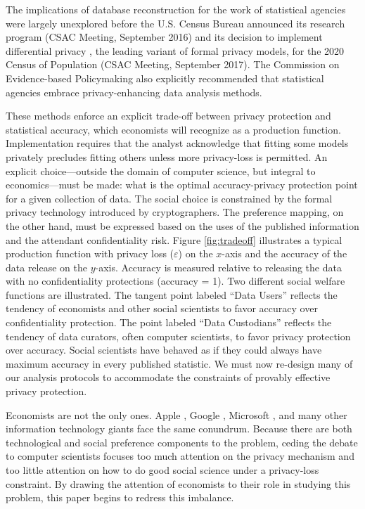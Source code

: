 \documentclass[dvipsnames,finalmode,PP]{AEA}
\begin{document}
The implications of database reconstruction for the work of statistical agencies were largely unexplored before the U.S. Census Bureau announced its research program (\ac{CSAC} Meeting, September 2016) and its decision to implement differential privacy \citep{Dwork2006a}, the leading variant of formal privacy models, for the 2020 Census of Population (\ac{CSAC} Meeting, September 2017). The Commission on Evidence-based Policymaking \citeyearpar{cep:promise:2017} also explicitly recommended that statistical agencies embrace privacy-enhancing data analysis methods.



These methods enforce an explicit trade-off between privacy protection and statistical accuracy, which economists will recognize as a production function. Implementation requires that the analyst acknowledge that fitting some models privately precludes fitting others unless more privacy-loss is permitted.
An explicit choice---outside the domain of computer science, but integral to economics---must be made: what is the optimal accuracy-privacy protection point for a given collection of data. The social choice is constrained by the formal privacy technology introduced by cryptographers. The preference mapping, on the other hand, must be expressed based on the uses of the published information and the attendant confidentiality risk.
Figure \ref{fig:tradeoff} illustrates a typical production function with privacy loss ($\varepsilon$) on the $x$-axis and the accuracy of the data release on the $y$-axis. Accuracy is measured relative to releasing the data with no confidentiality protections (accuracy = 1). Two different social welfare functions are illustrated. The tangent point labeled ``Data Users'' reflects the tendency of economists and other social scientists to favor accuracy over confidentiality protection. The point labeled ``Data Custodians'' reflects the tendency of data curators, often computer scientists, to favor privacy protection over accuracy. Social scientists have behaved as if they could always have maximum accuracy in every published statistic. We must now re-design many of our analysis protocols to accommodate the constraints of provably effective privacy protection.


Economists are not the only ones. Apple \citep{Apple:Learning:2017}, Google \citep{Erlingsson2014},  Microsoft \citep{Ding:Telemetry:NIPS:2017}, and many other information technology giants face the same conundrum. Because there are both technological and social preference components to the problem, ceding the debate to computer scientists focuses too much attention on the privacy mechanism and too little attention on how to do good social science under a privacy-loss constraint. By drawing the attention of economists to their role in studying this problem, this paper begins to redress this imbalance.
\end{document}
